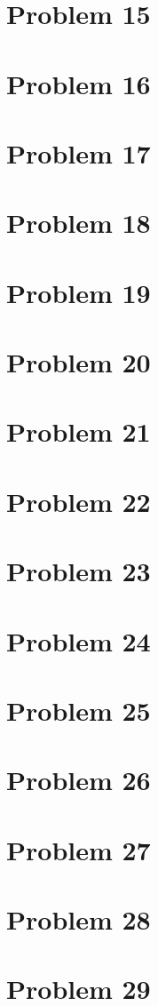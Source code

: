 \documentclass{article}
\begin{document}
\section*{Problem 15}
\section*{Problem 16}
\section*{Problem 17}
\section*{Problem 18}
\section*{Problem 19}
\section*{Problem 20}
\section*{Problem 21}
\section*{Problem 22}
\section*{Problem 23}
\section*{Problem 24}
\section*{Problem 25}
\section*{Problem 26}
\section*{Problem 27}
\section*{Problem 28}
\section*{Problem 29}
\end{document}
